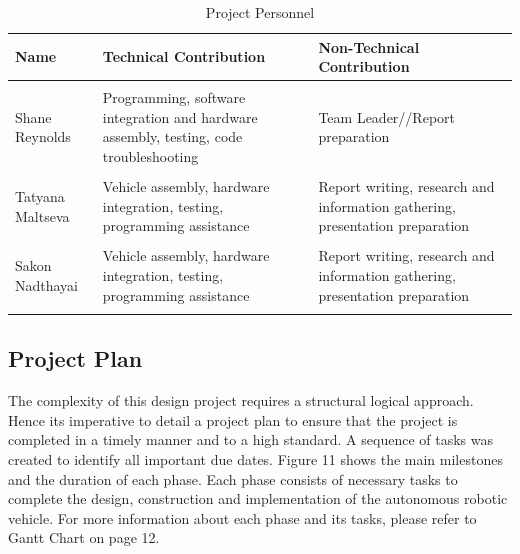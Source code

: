 \documentclass[a4paper]{article}
\begin{document}
\begin{table}[h]
\centering
\caption{Project Personnel}
\small\begin{tabular}{lp{5cm}p{5cm}}
\toprule
\textbf{Name} & \textbf{Technical Contribution} & \textbf{Non-Technical Contribution}\\
\midrule
 & & \\
Shane Reynolds & Programming, software integration and hardware assembly, testing, code troubleshooting & Team Leader//Report preparation\\
 & & \\
Tatyana Maltseva & Vehicle assembly, hardware integration, testing, programming assistance & Report writing, research and information gathering, presentation preparation\\
 & & \\
Sakon Nadthayai & Vehicle assembly, hardware integration, testing, programming assistance & Report writing, research and information gathering, presentation preparation\\
& & \\
\bottomrule
\end{tabular}
\end{table}

\subsection{Project Plan}
The complexity of this design project requires a structural logical approach. Hence its imperative to detail a project plan to ensure that the project is completed in a timely manner and to a high standard. A sequence of tasks was created to identify all important due dates. Figure 11 shows the main milestones and the duration of each phase. Each phase consists of necessary tasks to complete the design, construction and implementation of the autonomous robotic vehicle. For more information about each phase and its tasks, please refer to Gantt Chart on page 12.\\
\end{document}
